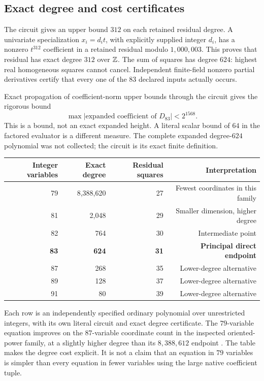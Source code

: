 \subsection{Exact degree and cost certificates}

The circuit gives an upper bound \(312\) on each retained residual degree.
A univariate specialization \(x_i=d_i t\), with explicitly supplied
integer \(d_i\), has a nonzero \(t^{312}\) coefficient in a retained
residual modulo \(1{,}000{,}003\). This proves that residual has exact
degree \(312\) over \(\mathbb Z\).
The sum of squares has degree \(624\): highest real homogeneous squares
cannot cancel. Independent finite-field nonzero partial derivatives
certify that every one of the \(83\) declared inputs actually occurs.

Exact propagation of coefficient-norm upper bounds through the circuit
gives the rigorous bound
\[
 \max |\text{expanded coefficient of }D_{83}|<2^{1568}.
\]
This is a bound, not an exact expanded height. A literal scalar bound
of \(64\) in the factored evaluator is a different measure. The complete expanded degree-\(624\)
polynomial was not collected; the circuit is its exact finite definition.



\begin{center}
\begin{tabular}{rrrr}
\toprule
Integer variables & Exact degree & Residual squares & Interpretation\\
\midrule
79 & 8,388,620 & 27 & Fewest coordinates in this family\\
81 & 2,048 & 29 & Smaller dimension, higher degree\\
82 & 764 & 30 & Intermediate point\\
\textbf{83} & \textbf{624} & \textbf{31} & \textbf{Principal direct endpoint}\\
87 & 268 & 35 & Lower-degree alternative\\
89 & 128 & 37 & Lower-degree alternative\\
91 & 80 & 39 & Lower-degree alternative\\
\bottomrule
\end{tabular}
\end{center}

Each row is an independently specified ordinary polynomial over unrestricted
integers, with its own literal circuit and exact degree certificate.
The \(79\)-variable equation improves on the \(87\)-variable coordinate
count in the inspected oriented-power family, at a slightly higher
degree than its \(8{,}388{,}612\) endpoint \cite{source177}.
The table makes the degree cost explicit. It is not a claim that an
equation in \(79\) variables is simpler than every equation in fewer
variables using the large native coefficient tuple.
